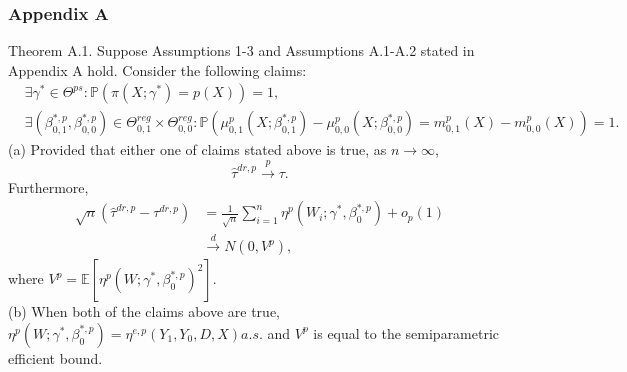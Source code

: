 \documentclass{beamer}
\begin{document}
\begin{frame}\frametitle{Appendix A}
    \footnotesize
    \begin{block}{Theorem A.1.}
        Suppose Assumptions 1-3 and Assumptions A.1-A.2 stated in Appendix A hold.
        Consider the following claims:
        \footnotesize
        \begin{align*}
            &\exists \gamma^{\ast} \in \Theta^{ps}:\mathbb{P}(\pi(X;\gamma^{\ast}) =p(X)) = 1,\\
            &\exists (\beta^{\ast, p}_{0,1}, \beta^{\ast, p}_{0,0}) \in \Theta^{reg}_{0,1} \times \Theta^{reg}_{0,0}:\mathbb{P}(\mu^{p}_{0,1}(X;\beta^{\ast,p}_{0,1}) - \mu^{p}_{0,0}(X;\beta^{\ast,p}_{0,0}) = m^{p}_{0,1}(X) - m^{p}_{0,0}(X)) = 1.
        \end{align*}
        \normalsize
        \footnotesize
        (a) Provided that either one of claims stated above is true, as $n \to \infty$,
        \begin{equation*}
            \widehat{\tau}^{dr,p} \overset{p}{\to} \tau.
        \end{equation*}
        Furthermore,
        \normalsize
        \footnotesize
        \begin{align*}
            \sqrt{n}(\widehat{\tau}^{dr,p} - \tau^{dr,p}) &= \frac{1}{\sqrt{n}}\sum_{i = 1}^{n}\eta^{p}(W_{i};\gamma^{\ast},\beta^{\ast,p}_{0}) + o_{p}(1)
            \\& \overset{d}{\to} N(0,V^{p}),
        \end{align*}
        \normalsize
        \footnotesize
        where $V^{p} = \mathbb{E}[\eta^{p}(W;\gamma^{\ast},\beta^{\ast,p}_{0})^{2}]$.\\
        (b) When both of the claims above are true, $\eta^{p}(W;\gamma^{\ast},\beta^{\ast, p}_{0}) = \eta^{e,p}(Y_{1}, Y_{0}, D, X) a.s.$ and $V^{p}$ is equal to the semiparametric efficient bound.
        \normalsize
    \end{block}
    \normalsize
\end{frame}
\end{document}
